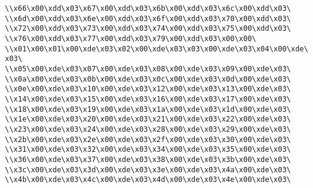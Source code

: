 \verb|\\x66\x00\xdd\x03\x67\x00\xdd\x03\x6b\x00\xdd\x03\x6c\x00\xdd\x03\|\newline
\verb|\\x6d\x00\xdd\x03\x6e\x00\xdd\x03\x6f\x00\xdd\x03\x70\x00\xdd\x03\|\newline
\verb|\\x72\x00\xdd\x03\x73\x00\xdd\x03\x74\x00\xdd\x03\x75\x00\xdd\x03\|\newline
\verb|\\x76\x00\xdd\x03\x77\x00\xdd\x03\x79\x00\xdd\x03\x00\x00\|\newline
\verb|\\x01\x00\x01\x00\xde\x03\x02\x00\xde\x03\x03\x00\xde\x03\x04\x00\xde\x03\|\newline
\verb|\\x05\x00\xde\x03\x07\x00\xde\x03\x08\x00\xde\x03\x09\x00\xde\x03\|\newline
\verb|\\x0a\x00\xde\x03\x0b\x00\xde\x03\x0c\x00\xde\x03\x0d\x00\xde\x03\|\newline
\verb|\\x0e\x00\xde\x03\x10\x00\xde\x03\x12\x00\xde\x03\x13\x00\xde\x03\|\newline
\verb|\\x14\x00\xde\x03\x15\x00\xde\x03\x16\x00\xde\x03\x17\x00\xde\x03\|\newline
\verb|\\x18\x00\xde\x03\x19\x00\xde\x03\x1a\x00\xde\x03\x1d\x00\xde\x03\|\newline
\verb|\\x1e\x00\xde\x03\x20\x00\xde\x03\x21\x00\xde\x03\x22\x00\xde\x03\|\newline
\verb|\\x23\x00\xde\x03\x24\x00\xde\x03\x28\x00\xde\x03\x29\x00\xde\x03\|\newline
\verb|\\x2b\x00\xde\x03\x2e\x00\xde\x03\x2f\x00\xde\x03\x30\x00\xde\x03\|\newline
\verb|\\x31\x00\xde\x03\x32\x00\xde\x03\x34\x00\xde\x03\x35\x00\xde\x03\|\newline
\verb|\\x36\x00\xde\x03\x37\x00\xde\x03\x38\x00\xde\x03\x3b\x00\xde\x03\|\newline
\verb|\\x3c\x00\xde\x03\x3d\x00\xde\x03\x3e\x00\xde\x03\x4a\x00\xde\x03\|\newline
\verb|\\x4b\x00\xde\x03\x4c\x00\xde\x03\x4d\x00\xde\x03\x4e\x00\xde\x03\|\newline
